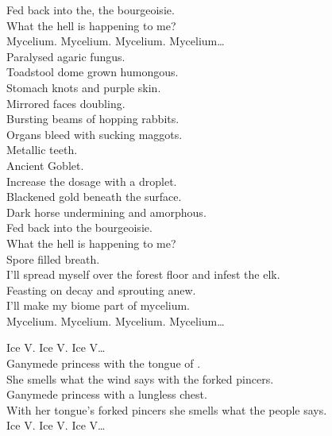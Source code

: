 Fed back into the, the bourgeoisie. \\
What the hell is happening to me? \\

Mycelium. Mycelium. Mycelium. Mycelium… \\

Paralysed agaric fungus. \\
Toadstool dome grown humongous. \\
Stomach knots and purple skin. \\
Mirrored faces doubling. \\
Bursting beams of hopping rabbits. \\
Organs bleed with sucking maggots. \\
Metallic teeth. \\
Ancient Goblet. \\
Increase the dosage with a droplet. \\
Blackened gold beneath the surface. \\
Dark horse undermining and amorphous. \\
Fed back into the bourgeoisie. \\
What the hell is happening to me? \\
Spore filled breath. \\
I'll spread myself over the forest floor and infest the elk. \\
Feasting on decay and sprouting anew. \\
I'll make my biome part of mycelium. \\

Mycelium. Mycelium. Mycelium. Mycelium… \\




Ice V. Ice V. Ice V… \\

Ganymede princess with the tongue of . \\
She smells what the wind says with the  forked pincers. \\
Ganymede princess with a lungless chest. \\
With her tongue's forked pincers she smells what the people says. \\

Ice V. Ice V. Ice V… \\

